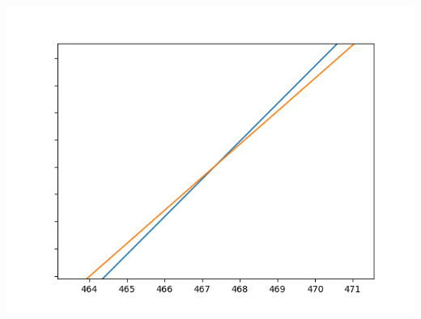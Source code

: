\documentclass{beamer}
\begin{document}

\begin{frame}
    \centering
    \includegraphics[height=0.97\textheight]{chartin.png}
\end{frame}
\end{document}
